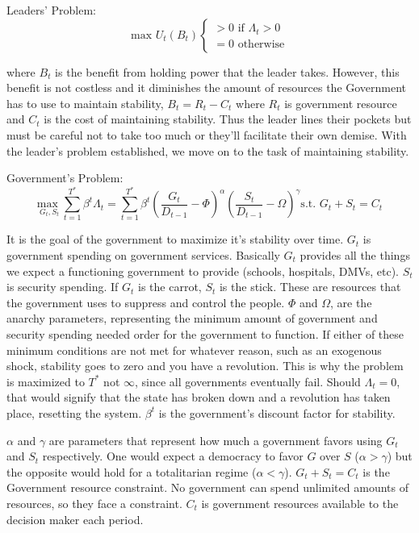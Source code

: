 \documentclass[12pt]{article}
\begin{document}
\begin{spacing}{1.5}
\vspace{.5 em}
\noindent Leaders' Problem:
\begin{equation}
	 \text{max } U_t(B_t) \begin{cases}
		>0 \text{ if } \Lambda_t > 0 \\
		= 0 \text{ otherwise} 	
	\end{cases}
\end{equation} 

\noindent where $B_t$ is the benefit from holding power that the leader takes. However, this benefit is not costless and it diminishes the amount of resources the Government has to use to maintain stability, $B_t=R_t-C_t$ where $R_t$ is government resource and $C_t$ is the cost of maintaining stability. Thus the leader lines their pockets but must be careful not to take too much or they'll facilitate their own demise. With the leader's problem established, we move on to the task of maintaining stability.   
\vspace{.5 em}

\noindent Government's Problem:
\begin{equation}
{\underset{G_t,S_t}{\text{max }}} \sum\limits_{t=1}^{T^*} \beta^t {\Lambda}_t = \sum\limits_{t=1}^{T^*} \beta^t\left(\frac{G_t}{D_{t-1}}-\Phi\right)^\alpha \left(\frac{S_t}{D_{t-1}}-\Omega\right)^\gamma   \text{s.t. } G_t+S_t=C_t
\end{equation}

It is the goal of the government to maximize it's stability over time. $G_t$ is government spending on government services. Basically $G_t$ provides all the things we expect a functioning government to provide (schools, hospitals, DMVs, etc). $S_t$ is security spending. If $G_t$ is the carrot, $S_t$ is the stick. These are resources that the government uses to suppress and control the people. 
$\Phi$ and $\Omega$, are the anarchy parameters, representing the minimum amount of government and security spending needed order for the government to function. If either of these minimum conditions are not met for whatever reason, such as an exogenous shock, stability goes to zero and you have a revolution. This is why the problem is maximized to $T^*$ not $\infty$, since all governments eventually fail. Should $\Lambda_t=0$, that would signify that the state has broken down and a revolution has taken place, resetting the system. $\beta^t$ is the government's discount factor for stability. 

$\alpha$ and $\gamma $  are parameters that represent how much a government favors using $G_t$ and $S_t$ respectively. One would expect a democracy to favor $G$ over $S$ ($\alpha > \gamma$) but the opposite would hold for a totalitarian regime ($\alpha < \gamma $). $G_t+S_t=C_t$ is the Government resource constraint. No government can spend unlimited amounts of resources, so they face a constraint. $C_t$ is government resources available to the decision maker each period. 


\end{spacing}
\end{document}
